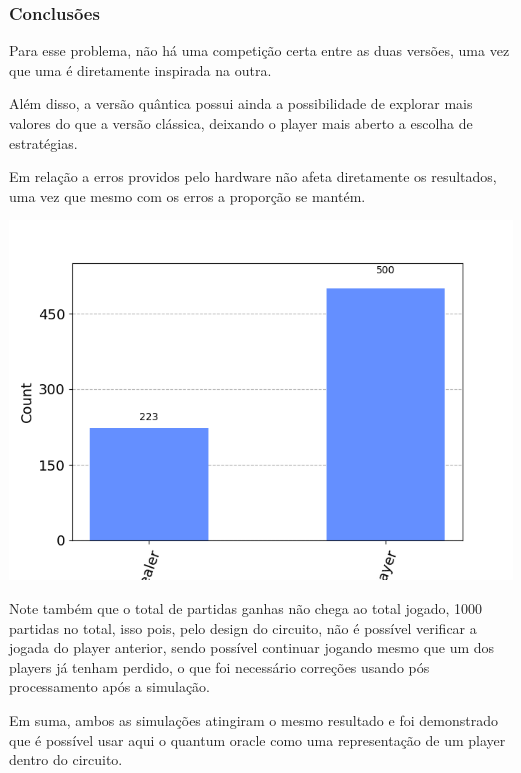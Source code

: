 \documentclass{article}
\begin{document}
\subsubsection{Conclusões}

Para esse problema, não há uma competição certa entre as duas versões, uma vez que uma é diretamente inspirada na outra.

Além disso, a versão quântica possui ainda a possibilidade de explorar mais valores do que a versão clássica, deixando o player mais aberto a escolha de estratégias.

Em relação a erros providos pelo hardware não afeta diretamente os resultados, uma vez que mesmo com os erros a proporção se mantém.


 \begin{center}
 	\includegraphics[scale=0.6]{final_buckshot_roulette_quantum_optimal_strategy_fake_melbourne.png}
 	\label{fig:bckr-fake-melbourne}
 \end{center}

Note também que o total de partidas ganhas não chega ao total jogado, 1000 partidas no total, isso pois, pelo design do circuito, não é possível verificar a jogada do player anterior, sendo possível continuar jogando mesmo que um dos players já tenham perdido, o que foi necessário correções usando pós processamento após a simulação.

Em suma, ambos as simulações atingiram o mesmo resultado e foi demonstrado que é possível usar aqui o quantum oracle como uma representação de um player dentro do circuito.
\end{document}
